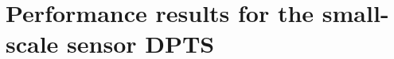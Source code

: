 %
\chapter{Performance results for the small-scale sensor DPTS}
\label{chap:dpts-results}
%
\textcolor{red}{\blindtext}